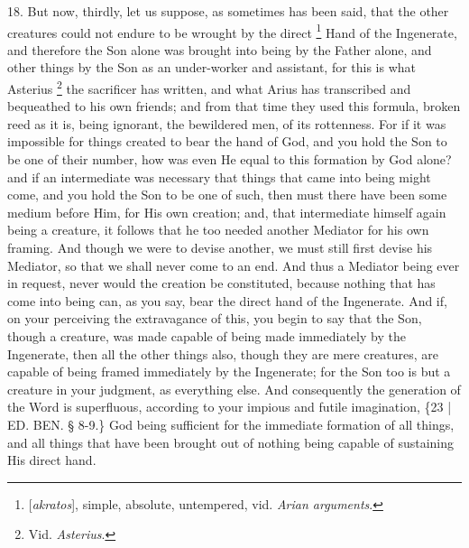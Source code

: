 18. But now, thirdly, let us
suppose, as sometimes has been said, that the other creatures could
not endure to be wrought by the direct \footnote{[\emph{akratos}], simple, absolute, untempered, vid. \emph{Arian
arguments}.} Hand of the Ingenerate, and therefore the Son alone was
brought into being by the Father alone, and other things by the Son as
an under-worker and assistant, for this is what Asterius \footnote{Vid. \emph{Asterius}.} the sacrificer has written, and what Arius has transcribed and
bequeathed to his own friends; and from that time they used this
formula, broken reed as it is, being ignorant, the bewildered men, of
its rottenness. For if it was impossible for things created to bear
the hand of God, and you hold the Son to be one of their number, how
was even He equal to this formation by God alone? and if an
intermediate was necessary that things that came into being might
come, and you hold the Son to be one of such, then must there have
been some medium before Him, for His own creation; and, that
intermediate himself again being a creature, it follows that he too
needed another Mediator for his own framing. And though we were to
devise another, we must still first devise his Mediator, so that we
shall never come to an end. And thus a Mediator being ever in request,
never would the creation be constituted, because nothing that has come
into being can, as you say, bear the direct hand of the Ingenerate.
And if, on your perceiving the extravagance of this, you begin to say
that the Son, though a creature, was made capable of being made
immediately by the Ingenerate, then all the other things also, though
they are mere creatures, are capable of being framed immediately by
the Ingenerate; for the Son too is but a creature in your judgment, as
everything else. And consequently the generation of the Word is
superfluous, according to your impious and futile imagination, \{23 | ED.
BEN. § 8-9.\} God being sufficient for the
immediate formation of all things, and all things that have been
brought out of nothing being capable of sustaining His direct hand.

